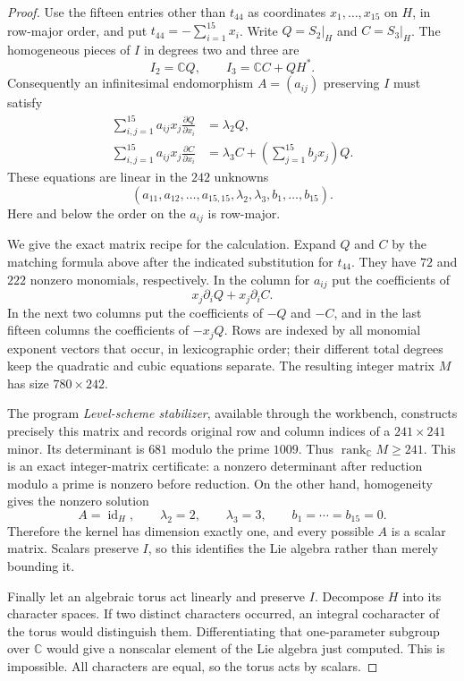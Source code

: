 \begin{proof}
Use the fifteen entries other than $t_{44}$ as coordinates
$x_1,\ldots,x_{15}$ on $H$, in row-major order, and put
$t_{44}=-\sum_{i=1}^{15}x_i$.  Write $Q=S_2|_H$ and $C=S_3|_H$.
The homogeneous pieces of $I$ in degrees two and three are
\[
 I_2=\mathbb C Q,\qquad I_3=\mathbb C C+QH^*.
\]
Consequently an infinitesimal endomorphism $A=(a_{ij})$ preserving $I$ must
satisfy
\begin{align}
 \sum_{i,j=1}^{15}a_{ij}x_j\frac{\partial Q}{\partial x_i}
     &=\lambda_2Q,\\
 \sum_{i,j=1}^{15}a_{ij}x_j\frac{\partial C}{\partial x_i}
     &=\lambda_3C+\left(\sum_{j=1}^{15}b_jx_j\right)Q
                                                        \label{eq:lie-cubic}.
\end{align}
These equations are linear in the $242$ unknowns
\[
 (a_{11},a_{12},\ldots,a_{15,15},\lambda_2,\lambda_3,b_1,\ldots,b_{15}).
\]
Here and below the order on the $a_{ij}$ is row-major.

We give the exact matrix recipe for the calculation.  Expand $Q$ and $C$ by the
matching formula above after the indicated substitution for $t_{44}$.  They have
$72$ and $222$ nonzero monomials, respectively.  In the column for $a_{ij}$ put
the coefficients of
\[
 x_j\partial_iQ+x_j\partial_iC.
\]
In the next two columns put the coefficients of $-Q$ and $-C$, and in the last
fifteen columns the coefficients of $-x_jQ$.  Rows are indexed by all monomial
exponent vectors that occur, in lexicographic order; their different total
degrees keep the quadratic and cubic equations separate.  The resulting integer
matrix $M$ has size $780\times242$.

The program \emph{Level-scheme stabilizer}, available through the workbench,
constructs precisely this matrix and records original row and column indices of
a $241\times241$ minor.  Its determinant is $681$ modulo the prime $1009$.
Thus $\operatorname{rank}_{\mathbb C}M\geq241$.  This is an exact integer-matrix
certificate: a nonzero determinant after reduction modulo a prime is nonzero
before reduction.  On the other hand, homogeneity gives the nonzero solution
\[
 A=\operatorname{id}_H,\qquad\lambda_2=2,\qquad\lambda_3=3,
 \qquad b_1=\cdots=b_{15}=0.
\]
Therefore the kernel has dimension exactly one, and every possible $A$ is a
scalar matrix.  Scalars preserve $I$, so this identifies the Lie algebra rather
than merely bounding it.

Finally let an algebraic torus act linearly and preserve $I$.  Decompose $H$ into
its character spaces.  If two distinct characters occurred, an integral
cocharacter of the torus would distinguish them.  Differentiating that
one-parameter subgroup over $\mathbb C$ would give a nonscalar element of the
Lie algebra just computed.  This is impossible.  All characters are equal, so
the torus acts by scalars.
\end{proof}

